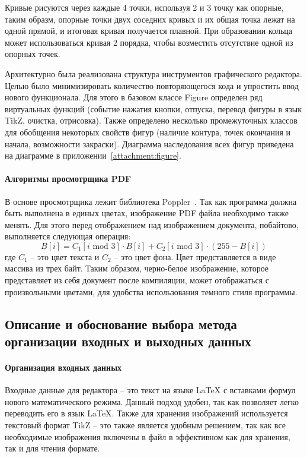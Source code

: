 \documentclass[explnote]{espd}
\begin{document}
Кривые рисуются через каждые 4 точки, используя 2 и 3 точку как опорные, таким образм, опорные точки двух соседних кривых и их общая точка лежат на одной прямой, и итоговая кривая получается плавной. При образовании кольца может использоваться кривая 2 порядка, чтобы возместить отсутствие одной из опорных точек.

Архитектурно была реализована структура инструментов графического редактора. Целью было минимизировать количество повторяющегося кода и упростить ввод нового функционала. Для этого в базовом классе Figure определен ряд виртуальных функций (событие нажатия кнопки, отпуска, перевод фигуры в язык TikZ, очистка, отрисовка). Также определено несколько промежуточных классов для обобщения некоторых свойств фигур (наличие контура, точек окончания и начала, возможности закраски). Диаграмма наследования всех фигур приведена на диаграмме в приложении~\ref{attachment:figure}.

\paragraph{Алгоритмы просмотрщика PDF}
В основе просмотрщика лежит библиотека Poppler~\cite{poppler}. Так как программа должна быть выполнена в единых цветах, изображение PDF файла необходимо также менять. Для этого перед отображением над изображением документа, побайтово, выполняется следующая операция:
\begin{equation}
B[i] = C_1[i\text{ mod }3] \cdot B[i] + C_2[i\text{ mod }3] \cdot (255 - B[i])
\end{equation}
где $C_1$ -- это цвет текста и $C_2$ -- это цвет фона. Цвет представляется в виде массива из трех байт. Таким образом, черно-белое изображение, которое представляет из себя документ после компиляции, может отображаться с произвольными цветами, для удобства использования темного стиля программы. 

\subsection{Описание и обоснование выбора метода организации входных и выходных данных}
\paragraph{Организация входных данных}
Входные данные для редактора -- это текст на языке LaTeX с вставками формул нового математического режима. Данный подход удобен, так как позволяет легко переводить его в язык LaTeX. Также для хранения изображений используется текстовый формат TikZ -- это также является удобным решением, так как все необходимые изображения включены в файл в эффективном как для хранения, так и для чтения формате.
\end{document}
